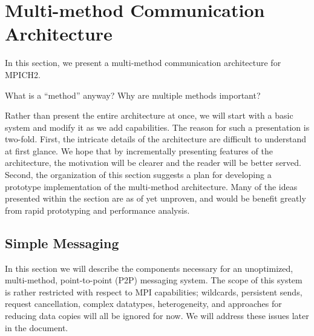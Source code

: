 \section{Multi-method Communication Architecture}

In this section, we present a multi-method communication architecture
for MPICH2.

What is a ``method'' anyway?  Why are multiple methods important?

Rather than present the entire architecture at once, we will start
with a basic system and modify it as we add capabilities.  The reason
for such a presentation is two-fold.  First, the intricate details of
the architecture are difficult to understand at first glance.  We hope
that by incrementally presenting features of the architecture, the
motivation will be clearer and the reader will be better served.
Second, the organization of this section suggests a plan for
developing a prototype implementation of the multi-method
architecture.  Many of the ideas presented within the section are as
of yet unproven, and would be benefit greatly from rapid prototyping
and performance analysis.




\subsection{Simple Messaging}

% 
% 

In this section we will describe the components necessary for an unoptimized,
multi-method, point-to-point (P2P) messaging system.  The scope of this system
is rather restricted with respect to MPI capabilities; wildcards, persistent
sends, request cancellation, complex datatypes, heterogeneity, and approaches
for reducing data copies will all be ignored for now.  We will address these
issues later in the document.

